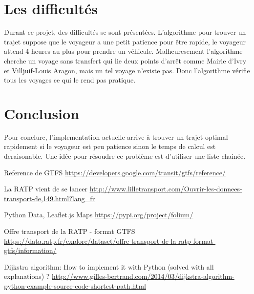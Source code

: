 \documentclass[a4paper, 12pt]{article}
\begin{document}
\section{Les difficult\'es}
Durant ce projet, des difficult\'es se sont pr\'esent\'ees. L'algorithme pour
 trouver un trajet suppose que le voyageur a une petit patience pour \^etre
 rapide, le voyageur attend 4 heures au plus pour prendre un v\'ehicule.
 Malheuresement l'algorithme cherche un voyage sans transfert qui lie deux
 points d'arr\^et comme Mairie d'Ivry et Villjuif-Louis Aragon, mais un tel
 voyage n'existe pas. Donc l'algorithme v\'erifie tous les voyages ce qui le
 rend pas pratique.

\section{Conclusion}
Pour conclure, l'implementation actuelle arrive \`a trouver un trajet optimal
 rapidement si le voyageur est peu patience sinon le temps de calcul est
 deraisonable. Une id\'ee pour r\'esoudre ce probl\`eme est d'utiliser une
 liste chain\'ee.

\begin{thebibliography}{9}
Reference de GTFS
  \url{https://developers.google.com/transit/gtfs/reference/}

La RATP vient de se lancer
  \url{http://www.lilletransport.com/Ouvrir-les-donnees-transport-de,149.html?lang=fr}

Python Data, Leaflet.js Maps
  \url{https://pypi.org/project/folium/}

Offre transport de la RATP - format GTFS
  \url{https://data.ratp.fr/explore/dataset/offre-transport-de-la-ratp-format-gtfs/information/}

Dijkstra algorithm: How to implement it with Python (solved with all explanations) ?
  \url{http://www.gilles-bertrand.com/2014/03/dijkstra-algorithm-python-example-source-code-shortest-path.html}
\end{thebibliography}
\end{document}
